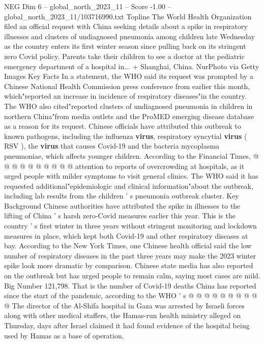 \begin{textsample}{NEG Dim 6 – global\_north\_2023\_11 – Score -1.00 – global\_north\_2023\_11/103716990.txt}  \label{ex:f6_neg_233}
Topline The World Health Organization filed an official request with China seeking details about a spike in respiratory illnesses and clusters of undiagnosed pneumonia among children late Wednesday as the country enters its first winter season since pulling back on its stringent zero Covid policy.
Parents take their children to see a doctor at the pediatric emergency department of a hospital in... + Shanghai, China.
NurPhoto via Getty Images Key Facts In a statement, the WHO said its request was prompted by a Chinese National Health Commission press conference from earlier this month, which"reported an increase in incidence of respiratory diseases"in the country.
The WHO also cited"reported clusters of undiagnosed pneumonia in children in northern China"from media outlets and the ProMED emerging disease database as a reason for its request.
Chinese officials have attributed this outbreak to known pathogens, including the influenza \textbf{virus}, respiratory syncytial \textbf{virus} ( RSV ), the \textbf{virus} that causes Covid-19 and the bacteria mycoplasma pneumoniae, which affects younger children.
According to the Financial Times, @ @ @ @ @ @ @ @ @ @ attention to reports of overcrowding at hospitals, as it urged people with milder symptoms to visit general clinics.
The WHO said it has requested additional"epidemiologic and clinical information"about the outbreak, including lab results from the children ' s pneumonia outbreak cluster.
Key Background Chinese authorities have attributed the spike in illnesses to the lifting of China ' s harsh zero-Covid measures earlier this year.
This is the country ' s first winter in three years without stringent monitoring and lockdown measures in place, which kept both Covid-19 and other respiratory diseases at bay.
According to the New York Times, one Chinese health official said the low number of respiratory diseases in the past three years may make the 2023 winter spike look more dramatic by comparison.
Chinese state media has also reported on the outbreak but has urged people to remain calm, saying most cases are mild.
Big Number 121,798.
That is the number of Covid-19 deaths China has reported since the start of the pandemic, according to the WHO ' s @ @ @ @ @ @ @ @ @ @ The director of the Al-Shifa hospital in Gaza was arrested by Israeli forces along with other medical staffers, the Hamas-run health ministry alleged on Thursday, days after Israel claimed it had found evidence of the hospital being used by Hamas as a base of operation.

\end{textsample}
